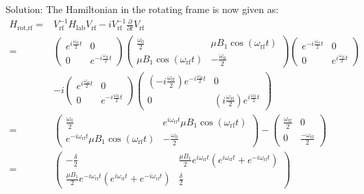 \documentclass{../lab}
\begin{document}
\begin{enumerate}
\begin{enumerate}
			Solution: The Hamiltonian in the rotating frame is now given as:
\begin{align*}
	H_\text{rot,rf} =& V_\text{rf}^{-1} H_\text{lab} V_\text{rf} - i V_\text{rf}^{-1}\frac{\partial}{\partial t} V_\text{rf} \\
	=& \begin{pmatrix}
		e^{i \frac{\omega_\text{rf}}{2}t} & 0 \\
		0 & e^{-i \frac{\omega_\text{rf}}{2}t}
	\end{pmatrix}
	\begin{pmatrix}
		\frac{\omega_\text{0}}{2} & \mu B_1 \cos(\omega_\text{rf} t) \\
		 \mu B_1 \cos(\omega_\text{rf} t)& - \frac{\omega_\text{0}}{2}
	\end{pmatrix}
	\begin{pmatrix}
		e^{-i \frac{\omega_\text{rf}}{2}t} & 0 \\
		0 & e^{i \frac{\omega_\text{rf}}{2}t}
	\end{pmatrix} \\
	&- i 
	\begin{pmatrix}
		e^{i \frac{\omega_\text{rf}}{2}t} & 0 \\
		0 & e^{-i \frac{\omega_\text{rf}}{2}t}
	\end{pmatrix}
	\begin{pmatrix}
		(-i \frac{\omega_\text{rf}}{2}) e^{-i \frac{\omega_\text{rf}}{2}t} & 0 \\
		0 &(i \frac{\omega_\text{rf}}{2}) e^{i \frac{\omega_\text{rf}}{2}t}
	\end{pmatrix} \\
	=& 
	\begin{pmatrix}
		\frac{\omega_\text{0}}{2} & e^{i \omega_\text{rf}t} \mu B_1 \cos(\omega_\text{rf} t) \\
		 e^{-i \omega_\text{rf}t} \mu B_1 \cos(\omega_\text{rf} t) & -\frac{\omega_\text{0}}{2} 
	\end{pmatrix}
	-
	\begin{pmatrix}
		\frac{\omega_\text{rf}}{2} & 0 \\
		0 & \frac{-\omega_\text{rf}}{2}
	\end{pmatrix} \\
	=& 
	\begin{pmatrix}
		-\frac{\delta}{2} & \frac{\mu B_1}{2}  e^{i \omega_\text{rf}t} \left( e^{i \omega_\text{rf} t} + e^{-i \omega_\text{rf} t}  \right) \\
		  \frac{\mu B_1}{2} e^{-i \omega_\text{rf}t} \left( e^{i \omega_\text{rf} t} + e^{-i \omega_\text{rf} t}  \right)  & \frac{\delta}{2}

\end{pmatrix}
\end{align*}
\end{enumerate}
\end{enumerate}
\end{document}
